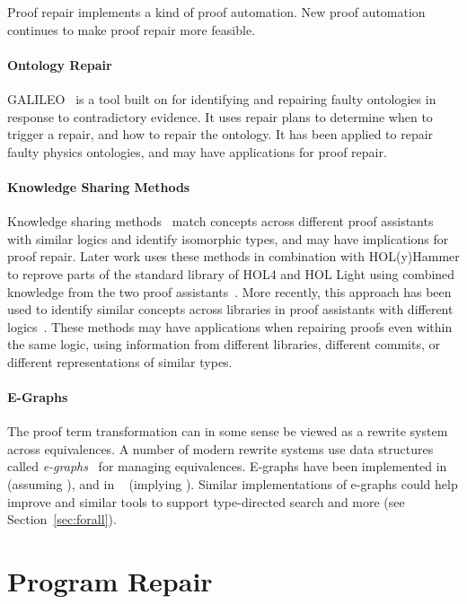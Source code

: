 Proof repair implements a kind of proof automation.
New proof automation continues to make proof repair more feasible.

\paragraph{Ontology Repair}
GALILEO~\cite{chan2011galileo} is a tool built on  for identifying and repairing faulty ontologies in response to contradictory
evidence. It uses repair plans to determine when to trigger a repair, and how to repair the ontology.
It has been applied to repair faulty physics ontologies, and may have applications for proof repair.

\paragraph{Knowledge Sharing Methods}
Knowledge sharing methods~\cite{gauthier2014} match concepts across
different proof assistants with similar logics and identify isomorphic types,
and may have implications for proof repair.
Later work uses these methods in combination with HOL(y)Hammer to
reprove parts of the standard library of HOL4 and HOL Light using combined knowledge 
from the two proof assistants~\cite{Gauthier2015}. 
More recently, this approach has been used to identify similar concepts
across libraries in proof assistants with different logics~\cite{gauthier2017}.
These methods may have applications
when repairing proofs even within the same logic, using information from different 
libraries, different commits, or different representations of similar types.

\paragraph{E-Graphs} %
The \toolnamec proof term transformation can in some sense be viewed as a rewrite system across equivalences.
A number of modern rewrite systems use data structures called \textit{e-graphs}~\cite{egraph1} for managing equivalences.
E-graphs have been implemented in ~\cite{selsam:lean} (assuming ),
and in ~\cite{egraph6} (implying ).
Similar implementations of e-graphs could help improve \toolnamec and similar tools to support
type-directed search and more (see Section~\ref{sec:forall}).

\section{Program Repair}
\label{sec:repair}

